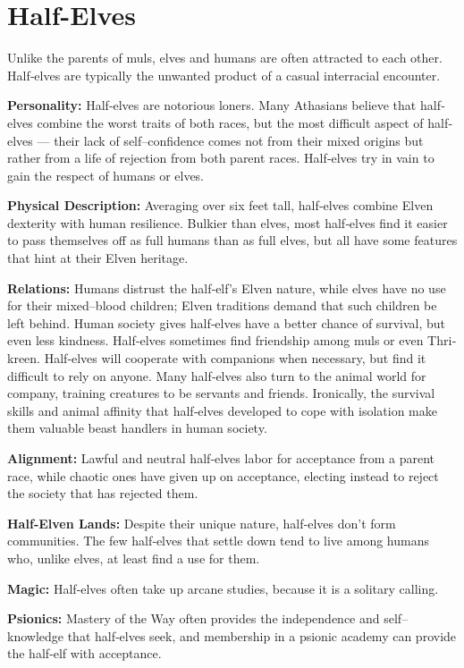 \documentclass[10pt,a4paper,twocolumn]{d20}
\begin{document}
\section{Half-Elves}
Unlike the parents of muls, elves and humans are often attracted to each other. Half‐elves are typically the unwanted product of a casual interracial encounter.

\textbf{Personality:} Half‐elves are notorious loners. Many Athasians believe that half‐elves combine the worst traits of both races, but the most difficult aspect of half‐elves --- their lack of self–confidence comes not from their mixed origins but rather from a life of rejection from both parent races. Half‐elves try in vain to gain the respect of humans or elves.

\textbf{Physical Description:} Averaging over six feet tall, half‐elves combine Elven dexterity with human resilience. Bulkier than elves, most half‐elves find it easier to pass themselves off as full humans than as full elves, but all have some features that hint at their Elven heritage.

\textbf{Relations:} Humans distrust the half‐elf’s Elven nature, while elves have no use for their mixed–blood children; Elven traditions demand that such children be left behind. Human society gives half‐elves have a better chance of survival, but even less kindness. Half‐elves sometimes find friendship among muls or even Thri‐kreen. Half‐elves will cooperate with companions when necessary, but find it difficult to rely on anyone. Many half‐elves also turn to the animal world for company, training creatures to be servants and friends. Ironically, the survival skills and animal affinity that half‐elves developed to cope with isolation make them valuable beast handlers in human society.

\textbf{Alignment:} Lawful and neutral half‐elves labor for acceptance from a parent race, while chaotic ones have given up on acceptance, electing instead to reject the society that has rejected them.

\textbf{Half‐Elven Lands:} Despite their unique nature, half‐elves don’t form communities. The few half‐elves that settle down tend to live among humans who, unlike elves, at least find a use for them.

\textbf{Magic:} Half‐elves often take up arcane studies, because it is a solitary calling.

\textbf{Psionics:} Mastery of the Way often provides the independence and self–knowledge that half‐elves seek, and membership in a psionic academy can provide the half‐elf with acceptance.
\end{document}
